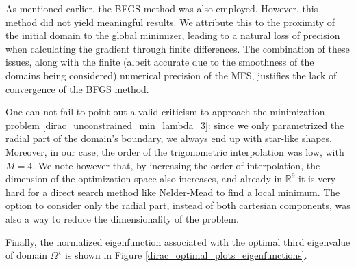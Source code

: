 \begin{figure}[!htb]
\begin{minipage}{.5\textwidth}
        \captionsetup{width=0.8\linewidth} %
        \label{dirac_val_third}
    \end{minipage}
\end{figure}

As mentioned earlier, the \ac{BFGS} method was also employed. However, this method did not yield meaningful results. We attribute this to the proximity of the initial domain to the global minimizer, leading to a natural loss of precision when calculating the gradient through finite differences. The combination of these issues, along with the finite (albeit accurate due to the smoothness of the domains being considered) numerical precision of the \ac{MFS}, justifies the lack of convergence of the \ac{BFGS} method.

\begin{remark}
    One can not fail to point out a valid criticism to approach the minimization problem \eqref{dirac_unconstrained_min_lambda_3}: since we only parametrized the radial part of the domain's boundary, we always end up with star-like shapes. Moreover, in our case, the order of the trigonometric interpolation was low, with \(M=4\). We note however that, by increasing the order of interpolation, the dimension of the optimization space also increases, and already in \(\mathbb{R}^9\) it is very hard for a direct search method like Nelder-Mead to find a local minimum. The option to consider only the radial part, instead of both cartesian components, was also a way to reduce the dimensionality of the problem.
\end{remark}

Finally, the normalized eigenfunction associated with the optimal third eigenvalue of domain \(\Omega^\star\) is shown in Figure \ref{dirac_optimal_plots_eigenfunctions}.

